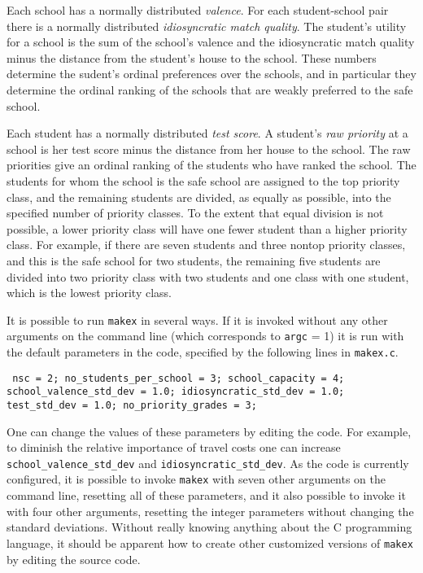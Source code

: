 \documentclass[12pt]{article}
\theoremstyle{definition}
\begin{document}
Each school has a normally distributed \emph{valence}.  For each
student-school pair there is a normally distributed
\emph{idiosyncratic match quality}.  The student's utility for a
school is the sum of the school's valence and the idiosyncratic match
quality minus the distance from the student's house to the school.
These numbers determine the sudent's ordinal preferences over the
schools, and in particular they determine the ordinal ranking of the
schools that are weakly preferred to the safe school.

Each student has a normally distributed \emph{test score}.  A
student's \emph{raw priority} at a school is her test score minus the
distance from her house to the school.  The raw priorities give an
ordinal ranking of the students who have ranked the school.  The
students for whom the school is the safe school are assigned to the
top priority class, and the remaining students are divided, as
equally as possible, into the specified number of priority classes.
To the extent that equal division is not possible, a lower priority
class will have one fewer student than a higher priority class.  For
example, if there are seven students and three nontop priority
classes, and this is the safe school for two students, the remaining
five students are divided into two priority class with two students
and one class with one student, which is the lowest priority class.

It is possible to run \texttt{makex} in several ways.  If it is
invoked without any other arguments on the command line (which
corresponds to \texttt{argc} = 1) it is run with the default
parameters in the code, specified by the following lines in
\texttt{makex.c}.
\begin{obeylines}\texttt{
  nsc = 2;
  no\_students\_per\_school = 3;
  school\_capacity = 4;
  school\_valence\_std\_dev = 1.0;
  idiosyncratic\_std\_dev = 1.0;
  test\_std\_dev = 1.0;
  no\_priority\_grades = 3;
}
\end{obeylines} \noindent
One can change the values of these parameters by editing the code.
For example, to diminish the relative importance of travel costs one
can increase \texttt{school\_valence\_std\_dev} and
\texttt{idiosyncratic\_std\_dev}.  As the code is currently
configured, it is possible to invoke \texttt{makex} with seven other
arguments on the command line, resetting all of these parameters, and
it also possible to invoke it with four other arguments, resetting the
integer parameters without changing the standard deviations.  Without
really knowing anything about the C programming language, it should be
apparent how to create other customized versions of \texttt{makex} by
editing the source code.
\end{document}
